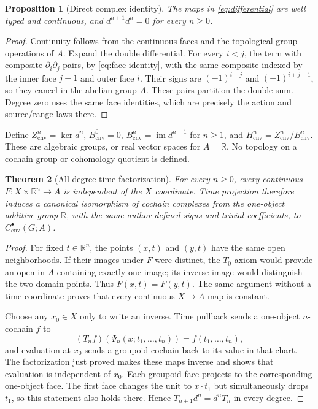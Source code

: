\documentclass[11pt]{article}
\newtheorem{theorem}{Theorem}[section]
\newtheorem{proposition}[theorem]{Proposition}
\theoremstyle{definition}
\newcommand{\R}{\mathbb R}
\newcommand{\Ccnv}{C_{\mathrm{cnv}}}
\newcommand{\Zcnv}{Z_{\mathrm{cnv}}}
\newcommand{\Bcnv}{B_{\mathrm{cnv}}}
\newcommand{\Hcnv}{H_{\mathrm{cnv}}}
\newcommand{\im}{\operatorname{im}}
\begin{document}
\begin{proposition}[Direct complex identity]
\label{prop:d-square}
The maps in \cref{eq:differential} are well typed and continuous, and
$d^{n+1}d^n=0$ for every $n\geq0$.
\end{proposition}

\begin{proof}
Continuity follows from the continuous faces and the topological group
operations of $A$.  Expand the double differential.  For every $i<j$, the
term with composite $\partial_i\partial_j$ pairs, by
\cref{eq:face-identity}, with the same composite indexed by the inner face
$j-1$ and outer face $i$.  Their signs are $(-1)^{i+j}$ and
$(-1)^{i+j-1}$, so they cancel in the abelian group $A$.  These pairs
partition the double sum.  Degree zero uses the same face identities, which
are precisely the action and source/range laws there.
\end{proof}

Define $\Zcnv^n=\ker d^n$, $\Bcnv^0=0$,
$\Bcnv^n=\im d^{n-1}$ for $n\geq1$, and
$\Hcnv^n=\Zcnv^n/\Bcnv^n$.  These are algebraic groups, or real vector
spaces for $A=\R$.  No topology on a cochain group or cohomology quotient is
defined.

\begin{theorem}[All-degree time factorization]
\label{thm:factorization}
For every $n\geq0$, every continuous $F:X\times\R^n\to A$ is independent
of the $X$ coordinate.  Time projection therefore induces a canonical
isomorphism of cochain complexes from the one-object additive group $\R$,
with the same author-defined signs and trivial coefficients, to
$\Ccnv^\bullet(G;A)$.
\end{theorem}

\begin{proof}
For fixed $t\in\R^n$, the points $(x,t)$ and $(y,t)$ have the same open
neighborhoods.  If their images under $F$ were distinct, the $T_0$ axiom
would provide an open in $A$ containing exactly one image; its inverse image
would distinguish the two domain points.  Thus $F(x,t)=F(y,t)$.  The same
argument without a time coordinate proves that every continuous $X\to A$
map is constant.

Choose any $x_0\in X$ only to write an inverse.  Time pullback sends a
one-object $n$-cochain $f$ to
\begin{equation}
\label{eq:time-pullback}
 (T_nf)(\Psi_n(x;t_1,\ldots,t_n))=f(t_1,\ldots,t_n),
\end{equation}
and evaluation at $x_0$ sends a groupoid cochain back to its value in that
chart.  The factorization just proved makes these maps inverse and shows
that evaluation is independent of $x_0$.  Each groupoid face projects to
the corresponding one-object face.  The first face changes the unit to
$x\mathbin{\cdot}t_1$ but simultaneously drops $t_1$, so this statement
also holds there.  Hence $T_{n+1}d^n=d^nT_n$ in every degree.
\end{proof}
\end{document}

